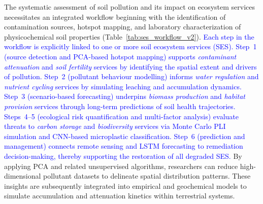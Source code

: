 \documentclass[environments,article,submit,pdftex,moreauthors]{Definitions/mdpi}
\begin{document}
The systematic assessment of soil pollution and its impact on ecosystem services necessitates an integrated workflow beginning with the identification of contamination sources, hotspot mapping, and laboratory characterization of physicochemical soil properties (Table~\ref{tab:ses_workflow_v2}). \textcolor{blue}{Each step in the workflow is explicitly linked to one or more soil ecosystem services (SES). Step~1 (source detection and PCA-based hotspot mapping) supports \emph{contaminant attenuation} and \emph{soil fertility} services by identifying the spatial extent and drivers of pollution. Step~2 (pollutant behaviour modelling) informs \emph{water regulation} and \emph{nutrient cycling} services by simulating leaching and accumulation dynamics. Step~3 (scenario-based forecasting) underpins \emph{biomass production} and \emph{habitat provision} services through long-term predictions of soil health trajectories. Steps~4--5 (ecological risk quantification and multi-factor analysis) evaluate threats to \emph{carbon storage} and \emph{biodiversity} services via Monte Carlo PLI simulation and CNN-based microplastic classification. Step~6 (prediction and management) connects remote sensing and LSTM forecasting to remediation decision-making, thereby supporting the restoration of all degraded SES.} By applying PCA and related unsupervised algorithms, researchers can reduce high-dimensional pollutant datasets to delineate spatial distribution patterns. These insights are subsequently integrated into empirical and geochemical models to simulate accumulation and attenuation kinetics within terrestrial systems.
\end{document}
